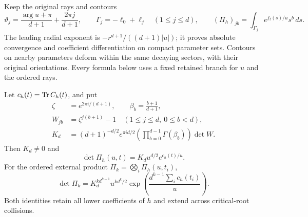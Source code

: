 Keep the original rays and contours
\begin{equation}
 \vartheta_j=\frac{\arg u+\pi}{d+1}+\frac{2\pi j}{d+1},
 \qquad \Gamma_j=-\ell_0+\ell_j\quad(1\le j\le d),
 \qquad
 (\Pi_h)_{jb}=\int_{\Gamma_j}e^{f_t(s)/u}s^b\,ds.
 \label{CFStage:BC:eq:period}
\end{equation}
The leading radial exponent is
$-r^{d+1}/((d+1)|u|)$; it proves absolute convergence and
coefficient differentiation on compact parameter sets.  Contours on
nearby parameters deform within the same decaying sectors, with their
original orientations.  Every formula below uses a fixed retained
branch for $u$ and the ordered rays.

\begin{theorem}
Let $c_h(t)=\operatorname{Tr} C_h(t)$, and put
\begin{align}
 \zeta&=e^{2\pi i/(d+1)},\qquad \beta_b=\frac{b+1}{d+1},
       \nonumber\\
 W_{jb}&=\zeta^{j(b+1)}-1
       \quad(1\le j\le d,\ 0\le b<d),\nonumber\\
 K_d&=(d+1)^{-d/2}e^{\pi i d/2}
           \left(\prod_{b=0}^{d-1}\Gamma(\beta_b)\right)\det W.
       \label{CFStage:BC:eq:constant}
\end{align}
Then $K_d\ne0$ and
\begin{equation}
 \boxed{\det\Pi_h(u,t)=K_d u^{d/2}e^{c_h(t)/u}.}
 \label{CFStage:BC:eq:det-one}
\end{equation}
For the ordered external product $\Pi_k=\bigotimes_i\Pi_h(u,t_i)$,
\begin{equation}
 \boxed{\det\Pi_k
   =K_d^{k d^{k-1}}u^{k d^k/2}
         \exp\!\left(\frac{d^{k-1}\sum_i c_h(t_i)}u\right).}
 \label{CFStage:BC:eq:det-all}
\end{equation}
Both identities retain all lower coefficients of $h$ and extend across
critical-root collisions.
\end{theorem}
